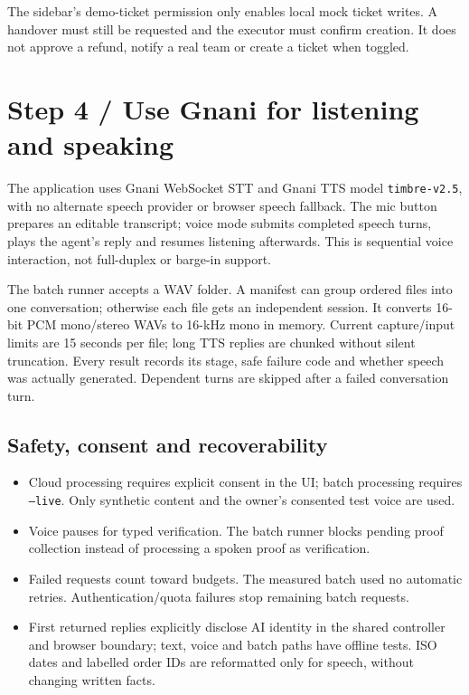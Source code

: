 \documentclass[10pt,a4paper]{article}
\newcommand{\note}[1]{\par\noindent\colorbox{mint}{\parbox{\dimexpr\linewidth-2\fboxsep}{\small #1}}\par}
\begin{document}
\note{The sidebar's demo-ticket permission only enables local mock ticket writes.
A handover must still be requested and the executor must confirm creation. It
does not approve a refund, notify a real team or create a ticket when toggled.}

\section{Step 4 / Use Gnani for listening and speaking}
The application uses Gnani WebSocket STT and Gnani TTS model
\texttt{timbre-v2.5}, with no alternate speech provider or browser speech fallback.
The mic button prepares an editable transcript; voice mode submits completed
speech turns, plays the agent's reply and resumes listening afterwards. This is
sequential voice interaction, not full-duplex or barge-in support.

The batch runner accepts a WAV folder. A manifest can group ordered files into
one conversation; otherwise each file gets an independent session. It converts
16-bit PCM mono/stereo WAVs to 16-kHz mono in memory. Current capture/input limits
are 15 seconds per file; long TTS replies are chunked without silent truncation.
Every result records its stage, safe failure code and whether speech was actually
generated. Dependent turns are skipped after a failed conversation turn.

\subsection{Safety, consent and recoverability}
\begin{itemize}
\item Cloud processing requires explicit consent in the UI; batch processing
requires \texttt{--live}. Only synthetic content and the owner's consented test voice are used.
\item Voice pauses for typed verification. The batch runner blocks pending proof
collection instead of processing a spoken proof as verification.
\item Failed requests count toward budgets. The measured batch used no automatic
retries. Authentication/quota failures stop remaining batch requests.
\item First returned replies explicitly disclose AI identity in the shared
controller and browser boundary; text, voice and batch paths have offline tests.
ISO dates and labelled order IDs are reformatted only for speech, without changing written facts.
\end{itemize}
\end{document}
